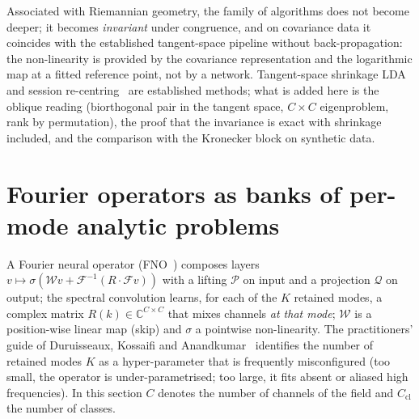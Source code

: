 \documentclass[11pt,a4paper]{article}
\theoremstyle{plain}
\theoremstyle{definition}
\theoremstyle{remark}
\newcommand{\Cx}{\mathbb C}
\begin{document}
Associated with Riemannian geometry, the family of algorithms does not
become deeper; it becomes \emph{invariant} under congruence, and on
covariance data it coincides with the established tangent-space pipeline
without back-propagation: the non-linearity is provided by the covariance
representation and the logarithmic map at a fitted reference point, not by
a network. Tangent-space
shrinkage LDA~\cite{barachant2012} and session re-centring~\cite{zanini2018}
are established methods; what is added here is the oblique reading (biorthogonal pair in the tangent
space, $C\times C$ eigenproblem, rank by permutation), the proof that the
invariance is exact with shrinkage included, and the comparison with the
Kronecker block on synthetic data.

\section{Fourier operators as banks of per-mode analytic problems}
\label{sec:fourier}
A Fourier neural operator (FNO~\cite{li2021fno}) composes layers
$v\mapsto\sigma(\mathcal Wv+\mathcal F^{-1}(R\cdot\mathcal Fv))$ with a
lifting $\mathcal P$ on input and a projection $\mathcal Q$ on output; the
spectral convolution learns, for each of the $K$ retained modes, a complex
matrix $R(k)\in\Cx^{C\times C}$ that mixes channels \emph{at that mode};
$\mathcal W$ is a position-wise linear map (skip) and $\sigma$ a pointwise
non-linearity. The practitioners' guide of Duruisseaux, Kossaifi and
Anandkumar~\cite{duruisseaux2025fno} identifies the number of retained
modes $K$ as a hyper-parameter that is frequently misconfigured (too small,
the operator is under-parametrised; too large, it fits absent or aliased
high frequencies). In this section $C$ denotes the number of channels of
the field and $C_{\mathrm{cl}}$ the number of classes.
\end{document}

